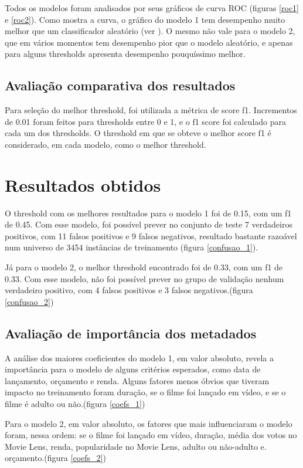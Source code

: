         Todos os modelos foram analisados por seus gráficos de curva ROC (figuras \ref{roc1} e \ref{roc2}). Como mostra a curva, o gráfico  do modelo 1 tem desempenho muito melhor que um classificador aleatório (ver ). O mesmo não vale para o modelo 2, que em vários momentos tem desempenho pior que o modelo aleatório, e apenas para alguns thresholds apresenta desempenho pouquíssimo melhor.

        \subsection{Avaliação comparativa dos resultados}\par
        Para seleção do melhor threshold, foi utilizada a métrica de score f1. Incrementos de 0.01 foram feitos para thresholds entre 0 e 1, e o f1 score foi calculado para cada um dos thresholds. O threshold em que se obteve o melhor score f1 é considerado, em cada modelo, como o melhor threshold.
        
    \section{Resultados obtidos}
        
        O threshold com os melhores resultados para o modelo 1 foi de 0.15, com um f1 de 0.45. Com esse modelo, foi possível prever no conjunto de teste 7 verdadeiros positivos, com 11 falsos positivos e 9 falsos negativos, resultado bastante razoável num universo de 3454 instâncias de treinamento (figura \ref{confusao_1}).
        
        Já para o modelo 2, o melhor threshold encontrado foi de 0.33, com um f1 de 0.33. Com esse modelo, não foi possível prever no grupo de validação nenhum verdadeiro positivo, com 4 falsos positivos e 3 falsos negativos.(figura \ref{confusao_2})

        \subsection{Avaliação de importância dos metadados}\par
        A análise dos maiores coeficientes do modelo 1, em valor absoluto, revela a importância para o modelo de alguns critérios esperados, como data de lançamento, orçamento e renda. Alguns fatores menos óbvios que tiveram impacto no treinamento foram duração, se o filme foi lançado em vídeo, e se o filme é adulto ou não.(figura \ref{coefs_1})\par
        
        Para o modelo 2, em valor absoluto, os fatores que mais influenciaram o modelo foram, nessa ordem: se o filme foi lançado em vídeo, duração, média dos votos no Movie Lens, renda, popularidade no Movie Lens, adulto ou não-adulto e. orçamento.(figura \ref{coefs_2})\par